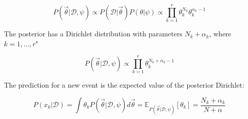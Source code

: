	$$P(\vec{\theta}|\mathcal{D}, \psi)\propto P(\mathcal{D}|\vec{\theta})P(\theta|\psi)\propto\prod\limits_{k=1}^r\theta_k^{N_k}\theta_k^{\alpha_k-1}$$

	The posterior has a Dirichlet distribution with parameters $N_k+\alpha_k$, where $k = 1, \dots, r$"

	$$P(\vec{\theta}|\mathcal{D}, \psi)\propto \prod\limits_{k=1}^r\theta_k^{N_k+\alpha_k-1}$$

	The prediction for a new event is the expected value of the posterior Dirichlet:

	$$P(x_k|\mathcal{D}) = \int\theta_k P(\vec{\theta}|\mathcal{D}, \psi)d\vec{\theta} = \mathbb{E}_{P(\vec{\theta}|\mathcal{D}, \psi)}[\theta_k] = \frac{N_k+\alpha_k}{N+\alpha}$$
